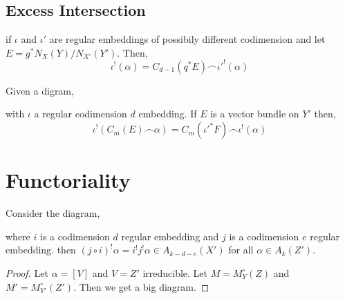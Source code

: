 \documentclass[12pt]{article}
\begin{document}
\subsection{Excess Intersection}

\begin{center}
\end{center}
if $\iota$ and $\iota'$ are regular embeddings of possibily different codimension
and let $E = g^* N_X(Y) / N_{X'}(Y')$. Then,
\[ \iota^!(\alpha) = C_{d-1}(q^* E) \frown \iota'^!(\alpha) \]

\begin{prop}
Given a digram,
\begin{center}
\end{center}
with $\iota$ a regular codimension $d$ embedding. If $E$ is a vector bundle on $Y'$ then,
\[ \iota^! (C_m(E) \frown \alpha) = C_m(\iota'^* F) \frown \iota^!(\alpha) \]
\end{prop}

\section{Functoriality}

\begin{prop}
Consider the diagram,
\begin{center}
\end{center}
where $i$ is a codimension $d$ regular embedding and $j$ is a codimension $e$ regular embedding. 
then $(j \circ i)^! \alpha = i^! j^! \alpha \in A_{k-d-e}(X')$ for all $\alpha \in A_k(Z')$.
\end{prop}

\begin{proof}
Let $\alpha = [V]$ and $V = Z'$ irreducible. Let $M = M_Y^\circ(Z)$ and $M' = M_{Y'}^\circ(Z')$. Then we get a big diagram. 
\end{proof}
\end{document}
